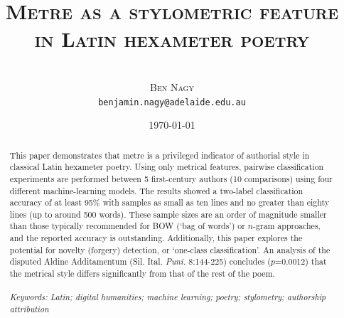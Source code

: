 \documentclass[11pt,a4paper]{scrartcl} %
\begin{document}
\title{\rmfamily\normalfont\textsc{Metre as a stylometric feature in Latin hexameter poetry}}
\author{\phantom{xxx}\\\textsc{Ben Nagy}\\\small{\texttt{benjamin.nagy@adelaide.edu.au}}}
\date{\normalsize{\today}}

\maketitle

\begin{abstract}
\noindent
This paper demonstrates that metre is a privileged indicator of authorial style in classical Latin hexameter poetry. Using only metrical features, pairwise classification experiments are performed between 5 first-century authors (10 comparisons) using four different machine-learning models. The results showed a two-label classification accuracy of at least 95\% with samples as small as ten lines and no greater than eighty lines (up to around 500 words). These sample sizes are an order of magnitude smaller than those typically recommended for BOW (`bag of words') or $n$-gram approaches, and the reported accuracy is outstanding. Additionally, this paper explores the potential for novelty (forgery) detection, or `one-class classification'. An analysis of the disputed Aldine Additamentum (Sil. Ital. \textit{Puni.} 8:144-225) concludes ($p$=0.0012) that the metrical style differs significantly from that of the rest of the poem.\\
\phantom{xxx}\\
\noindent\textit{Keywords: Latin; digital humanities; machine learning; poetry; stylometry; authorship attribution}
\end{abstract}
\end{document}
